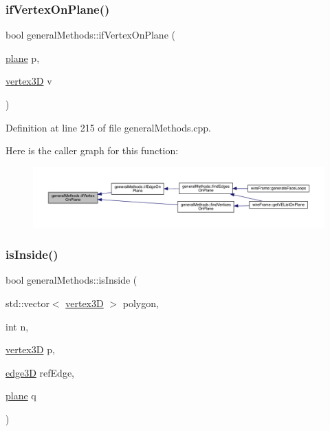 \subsubsection{\texorpdfstring{if\+Vertex\+On\+Plane()}{ifVertexOnPlane()}}
{\footnotesize\ttfamily bool general\+Methods\+::if\+Vertex\+On\+Plane (\begin{DoxyParamCaption}\item[{\mbox{\hyperlink{structplane}{plane}}}]{p,  }\item[{\mbox{\hyperlink{structvertex3_d}{vertex3D}}}]{v }\end{DoxyParamCaption})}



Definition at line 215 of file general\+Methods.\+cpp.

Here is the caller graph for this function\+:
\nopagebreak
\begin{figure}[H]
\begin{center}
\leavevmode
\includegraphics[width=350pt]{namespacegeneral_methods_a330682bb45234d8de5228a7607d493d2_icgraph}
\end{center}
\end{figure}
\mbox{\label{namespacegeneral_methods_a27b7ed292415027c495942147e8856b7}} 
\subsubsection{\texorpdfstring{is\+Inside()}{isInside()}}
{\footnotesize\ttfamily bool general\+Methods\+::is\+Inside (\begin{DoxyParamCaption}\item[{std\+::vector$<$ \mbox{\hyperlink{structvertex3_d}{vertex3D}} $>$}]{polygon,  }\item[{int}]{n,  }\item[{\mbox{\hyperlink{structvertex3_d}{vertex3D}}}]{p,  }\item[{\mbox{\hyperlink{structedge3_d}{edge3D}}}]{ref\+Edge,  }\item[{\mbox{\hyperlink{structplane}{plane}}}]{q }\end{DoxyParamCaption})}



